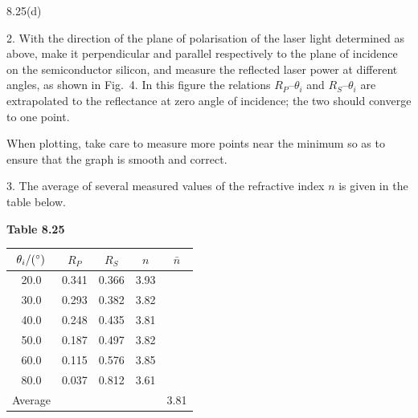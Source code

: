 \begin{figbox}{8.25(d)}
\end{figbox}

2. With the direction of the plane of polarisation of the laser light determined as above, make it perpendicular and parallel respectively to the plane of incidence on the semiconductor silicon, and measure the reflected laser power at different angles, as shown in Fig.~4. In this figure the relations $R_P$--$\theta_i$ and $R_S$--$\theta_i$ are extrapolated to the reflectance at zero angle of incidence; the two should converge to one point.

When plotting, take care to measure more points near the minimum so as to ensure that the graph is smooth and correct.

3. The average of several measured values of the refractive index $n$ is given in the table below.

\begin{center}
\textbf{Table 8.25}\\[3pt]
\begin{tabular}{ccccc}
\toprule
$\theta_i/(^{\circ})$ & $R_P$ & $R_S$ & $n$ & $\bar{n}$ \\
\midrule
20.0 & 0.341 & 0.366 & 3.93 & \\
30.0 & 0.293 & 0.382 & 3.82 & \\
40.0 & 0.248 & 0.435 & 3.81 & \\
50.0 & 0.187 & 0.497 & 3.82 & \\
60.0 & 0.115 & 0.576 & 3.85 & \\
80.0 & 0.037 & 0.812 & 3.61 & \\
\midrule
Average & & & & 3.81 \\
\bottomrule
\end{tabular}
\end{center}

